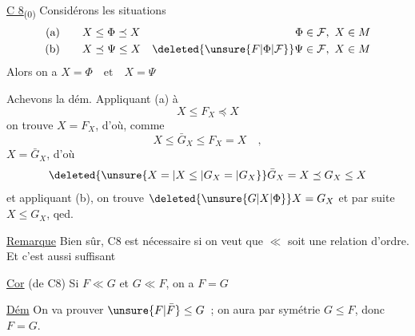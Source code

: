 
\noindent\llap{\smash{\rule[-4.9\baselineskip]{.35pt}{5.6\baselineskip}\hspace{.20em}\rule[-4.9\baselineskip]{.35pt}{5.6\baselineskip}}\hspace{.6em}}\uline{C 8}\textsubscript{(0)} Considérons les situations
\[
\begin{aligned}
\text{(a)}\qquad &X\leq\Phi\preceq X & \Phi&\in\mathcal F,\ X\in M\\
\text{(b)}\qquad &X\preceq\Psi\leq X & \deleted{\unsure{F|\Phi|\mathcal F}}\Psi&\in\mathcal F,\ X\in M
\end{aligned}
\]
Alors on a $X=\Phi\quad\text{et}\quad X=\Psi$

Achevons la dém. Appliquant (a) à
\[
X\leq F_X\preceq X
\]
on trouve $X=F_X$, d'où, comme
\[
X\leq\bar G_X\leq F_X=X\quad,
\]
$X=\bar G_X$, d'où
\[
\deleted{\unsure{X=|X\leq|G_X=|G_X}}\bar G_X=X\preceq G_X\leq X
\]
et appliquant (b), on trouve $\deleted{\unsure{G|X|\Phi}}X=G_X$ et par suite $X\leq G_X$, qed.

\uline{Remarque} Bien sûr, C8 est nécessaire si on veut que $\ll$ soit une relation d'ordre. Et c'est aussi suffisant\unsure{,:|;:|;}

\uline{Cor} (de C8)  Si $F\ll G$ et $G\ll F$, on a $F=G$

\uline{Dém}  On va prouver $\unsure{F|\bar F}\leq G$\ ;  on aura par symétrie $G\leq F$, donc $F=G$.

